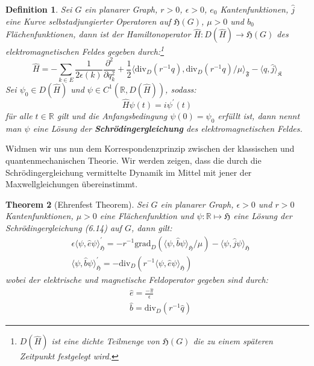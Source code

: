 \documentclass[11pt,a4paper,leqno]{report}
\newtheorem{theorem}{Theorem}[chapter]
\newtheorem{definition}[theorem]{Definition}
\numberwithin{equation}{chapter}
\begin{document}
\begin{definition}
	Sei $G$ ein planarer Graph, $r>0$, $\epsilon>0$, $e_0$ Kantenfunktionen, $\hat{j}$ eine Kurve selbstadjungierter Operatoren auf $\mathfrak{H}(G)$, $\mu>0$ und $b_0$ Fl\"achenfunktionen, dann ist der Hamiltonoperator $\hat{H}:D(\hat{H})\rightarrow \mathfrak{H}(G)$ des elektromagnetischen Feldes gegeben durch:\footnote{$D(\hat{H})$ ist eine dichte Teilmenge von $\mathfrak{H}(G)$ die zu einem sp\"ateren Zeitpunkt festgelegt wird.}
	\begin{equation}
	\hat{H}=-\sum_{k\in E}\frac{1}{2\epsilon(k)}\frac{\partial^2}{\partial q_k^2} + \frac{1}{2}\langle \text{div}_D(r^{-1}q), \text{div}_D(r^{-1}q)/\mu\rangle_{\mathfrak{F}} - \langle q, \hat{j}\rangle_{\mathfrak{K}}
	\end{equation}
	Sei $\psi_0\in D(\hat{H})$ und $\psi\in C^1(\mathbb{R}, D(\hat{H}))$, sodass:
\begin{equation}
\hat{H}\psi(t) = i\psi^\prime(t)
\end{equation}
f\"ur alle $t\in\mathbb{R}$ gilt und die Anfangsbedingung $\psi(0)=\psi_0$ erf\"ullt ist, dann nennt man $\psi$ eine L\"osung der
\textbf{Schr\"odingergleichung} des elektromagnetischen Feldes.
\end{definition}
\noindent
Widmen wir uns nun dem Korrespondenzprinzip zwischen der klassischen und quantenmechanischen Theorie.
Wir werden zeigen, dass die durch die Schr\"odingergleichung vermittelte Dynamik im Mittel mit jener der Maxwellgleichungen \"ubereinstimmt. 
\begin{theorem}[Ehrenfest Theorem]
	Sei $G$ ein planarer Graph, $\epsilon>0$ und $r>0$ Kantenfunktionen, $\mu>0$ eine Fl\"achenfunktion und $\psi: \mathbb{R}\mapsto \mathfrak{H}$ eine L\"osung der Schr\"odingergleichung (6.14) auf $G$, dann gilt:
	\begin{align}
		&\epsilon\langle \psi, \hat{e}\psi\rangle_{\mathfrak{H}}^\prime =  -r^{-1} \text{grad}_D(\langle\psi,\hat{b}\psi\rangle_{\mathfrak{H}}/\mu) -  \langle \psi, \hat{j} \psi\rangle_{\mathfrak{H}}\\
		&\langle \psi, \hat{b}\psi\rangle_{\mathfrak{H}}^\prime = -\text{div}_D(r^{-1}\langle\psi, \hat{e}\psi\rangle_{\mathfrak{H}})
	\end{align}
	wobei der elektrische und magnetische Feldoperator gegeben sind durch:
	\begin{align}
		&\hat{e} = \frac{-\hat{\pi}}{\epsilon}\\
		&\hat{b} = \text{div}_D(r^{-1}\hat{q})
	\end{align}
\end{theorem}
\end{document}
